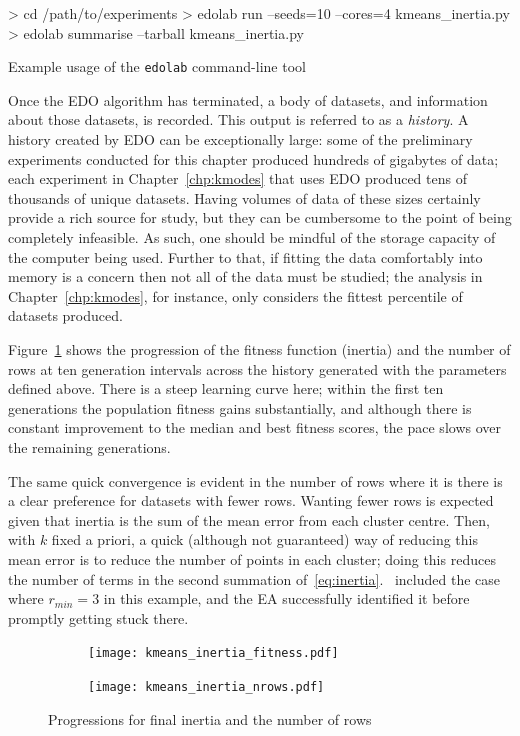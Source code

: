 \begin{listing}
\begin{usagesh}
> cd /path/to/experiments
> edolab run --seeds=10 --cores=4 kmeans_inertia.py
> edolab summarise --tarball kmeans_inertia.py
\end{usagesh}
\caption{Example usage of the \texttt{edolab} command-line tool}
\label{snp:edolab}
\end{listing}

Once the EDO algorithm has terminated, a body of datasets, and information about
those datasets, is recorded. This output is referred to as a \emph{history}. A
history created by EDO can be exceptionally large: some of the preliminary
experiments conducted for this chapter produced hundreds of gigabytes of data;
each experiment in Chapter~\ref{chp:kmodes} that uses EDO produced tens of
thousands of unique datasets. Having volumes of data of these sizes certainly
provide a rich source for study, but they can be cumbersome to the point of
being completely infeasible. As such, one should be mindful of the storage
capacity of the computer being used. Further to that, if fitting the data
comfortably into memory is a concern then not all of the data must be studied;
the analysis in Chapter~\ref{chp:kmodes}, for instance, only considers the
fittest percentile of datasets produced.

Figure~\ref{fig:inertia_progression} shows the progression of the fitness
function (inertia) and the number of rows at ten generation intervals across the
history generated with the parameters defined above. There is a steep learning
curve here; within the first ten generations the population fitness gains
substantially, and although there is constant improvement to the median and best
fitness scores, the pace slows over the remaining generations.

The same quick convergence is evident in the number of rows where it is there is
a clear preference for datasets with fewer rows. Wanting fewer rows is
expected given that inertia is the sum of the mean error from each cluster
centre. Then, with \(k\) fixed a priori, a quick (although not guaranteed) way
of reducing this mean error is to reduce the number of points in each cluster;
doing this reduces the number of terms in the second summation
of~\eqref{eq:inertia}.~\cite{Wilde2020:edo} included the case where
\(r_{min}=3\) in this example, and the EA successfully identified it before
promptly getting stuck there.

\begin{figure}
    \centering
    \begin{subfigure}{\imgwidth}
        \texttt{[image: kmeans\_inertia\_fitness.pdf]}%
    \end{subfigure}

    \begin{subfigure}{\imgwidth}
        \texttt{[image: kmeans\_inertia\_nrows.pdf]}%
    \end{subfigure}
    \caption{%
        Progressions for final inertia and the number of rows
    }\label{fig:inertia_progression}
\end{figure}

